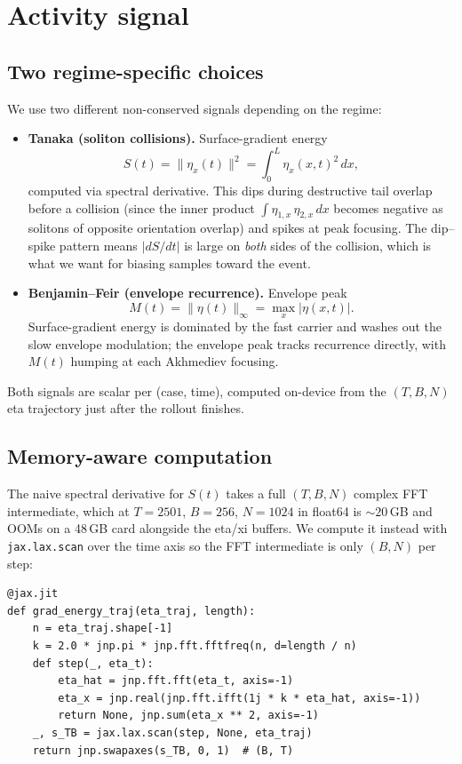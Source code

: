 \documentclass[11pt]{article}
\begin{document}
\section{Activity signal}

\subsection{Two regime-specific choices}

We use two different non-conserved signals depending on the regime:

\begin{itemize}
  \item \textbf{Tanaka (soliton collisions).} Surface-gradient energy
  \[
    S(t) = \|\eta_x(t)\|^2 = \int_0^L \eta_x(x,t)^2 \, dx,
  \]
  computed via spectral derivative. This dips during destructive tail overlap
  before a collision (since the inner product
  $\int \eta_{1,x}\,\eta_{2,x}\,dx$ becomes negative as solitons of opposite
  orientation overlap) and spikes at peak focusing. The dip--spike pattern
  means $|dS/dt|$ is large on \emph{both} sides of the collision, which is
  what we want for biasing samples toward the event.

  \item \textbf{Benjamin--Feir (envelope recurrence).} Envelope peak
  \[
    M(t) = \|\eta(t)\|_{\infty} = \max_x |\eta(x,t)|.
  \]
  Surface-gradient energy is dominated by the fast carrier and washes out the
  slow envelope modulation; the envelope peak tracks recurrence directly, with
  $M(t)$ humping at each Akhmediev focusing.
\end{itemize}

Both signals are scalar per (case, time), computed on-device from the
$(T, B, N)$ eta trajectory just after the rollout finishes.

\subsection{Memory-aware computation}

The naive spectral derivative for $S(t)$ takes a full $(T, B, N)$ complex
FFT intermediate, which at $T = 2501$, $B = 256$, $N = 1024$ in float64 is
$\sim 20$\,GB and OOMs on a 48\,GB card alongside the eta/xi buffers. We compute
it instead with \texttt{jax.lax.scan} over the time axis so the FFT intermediate
is only $(B, N)$ per step:

\begin{lstlisting}
@jax.jit
def grad_energy_traj(eta_traj, length):
    n = eta_traj.shape[-1]
    k = 2.0 * jnp.pi * jnp.fft.fftfreq(n, d=length / n)
    def step(_, eta_t):
        eta_hat = jnp.fft.fft(eta_t, axis=-1)
        eta_x = jnp.real(jnp.fft.ifft(1j * k * eta_hat, axis=-1))
        return None, jnp.sum(eta_x ** 2, axis=-1)
    _, s_TB = jax.lax.scan(step, None, eta_traj)
    return jnp.swapaxes(s_TB, 0, 1)  # (B, T)
\end{lstlisting}
\end{document}
